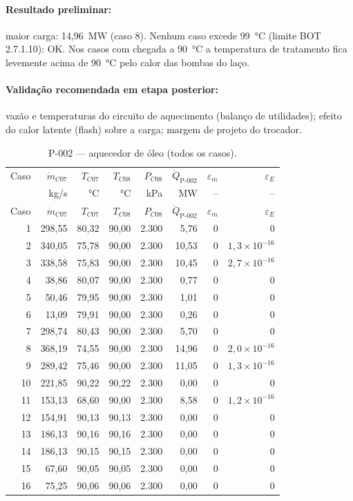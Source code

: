 \documentclass[11pt,a4paper]{article}
\numberwithin{equation}{section}
\numberwithin{table}{section}
\numberwithin{figure}{section}
\begin{document}
\paragraph{Resultado preliminar:} maior carga: 14,96~\si{\mega\watt} (caso 8). Nenhum caso excede 99~\si{\celsius} (limite BOT 2.7.1.10): OK. Nos casos com chegada a 90~\si{\celsius} a temperatura de tratamento fica levemente acima de 90~\si{\celsius} pelo calor das bombas do laço.
\paragraph{Validação recomendada em etapa posterior:} vazão e temperaturas do circuito de aquecimento (balanço de utilidades); efeito do calor latente (flash) sobre a carga; margem de projeto do trocador.
{\footnotesize\setlength{\tabcolsep}{3.5pt}\begin{longtable}{rrrrrrrr}
\caption{P-002 --- aquecedor de óleo (todos os casos).\label{tab:b04}}\\\toprule
Caso & $\dot m_{C07}$ & $T_{C07}$ & $T_{C08}$ & $P_{C08}$ & $\dot Q_{\mbox{P-002}}$ & $\varepsilon_m$ & $\varepsilon_E$\\
 & kg/s & °C & °C & kPa & MW & -- & --\\\midrule\endfirsthead
\toprule Caso & $\dot m_{C07}$ & $T_{C07}$ & $T_{C08}$ & $P_{C08}$ & $\dot Q_{\mbox{P-002}}$ & $\varepsilon_m$ & $\varepsilon_E$\\\midrule\endhead
1 & 298,55 & 80,32 & 90,00 & 2.300 & 5,76 & $0$ & $0$\\
2 & 340,05 & 75,78 & 90,00 & 2.300 & 10,53 & $0$ & $1{,}3\times10^{-16}$\\
3 & 338,58 & 75,83 & 90,00 & 2.300 & 10,45 & $0$ & $2{,}7\times10^{-16}$\\
4 & 38,86 & 80,07 & 90,00 & 2.300 & 0,77 & $0$ & $0$\\
5 & 50,46 & 79,95 & 90,00 & 2.300 & 1,01 & $0$ & $0$\\
6 & 13,09 & 79,91 & 90,00 & 2.300 & 0,26 & $0$ & $0$\\
7 & 298,74 & 80,43 & 90,00 & 2.300 & 5,70 & $0$ & $0$\\
8 & 368,19 & 74,55 & 90,00 & 2.300 & 14,96 & $0$ & $2{,}0\times10^{-16}$\\
9 & 289,42 & 75,46 & 90,00 & 2.300 & 11,05 & $0$ & $1{,}3\times10^{-16}$\\
10 & 221,85 & 90,22 & 90,22 & 2.300 & 0,00 & $0$ & $0$\\
11 & 153,13 & 68,60 & 90,00 & 2.300 & 8,58 & $0$ & $1{,}2\times10^{-16}$\\
12 & 154,91 & 90,13 & 90,13 & 2.300 & 0,00 & $0$ & $0$\\
13 & 186,13 & 90,16 & 90,16 & 2.300 & 0,00 & $0$ & $0$\\
14 & 186,13 & 90,15 & 90,15 & 2.300 & 0,00 & $0$ & $0$\\
15 & 67,60 & 90,05 & 90,05 & 2.300 & 0,00 & $0$ & $0$\\
16 & 75,25 & 90,06 & 90,06 & 2.300 & 0,00 & $0$ & $0$\\
\bottomrule\end{longtable}}
\end{document}
